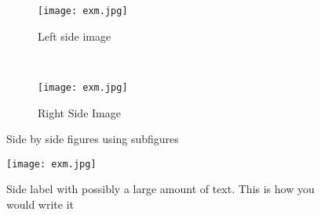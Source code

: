 \begin{figure}[!hbt]
    \centering
    \begin{subfigure}[b]{0.4\textwidth}
        \texttt{[image: exm.jpg]}
        \caption{Left side image}
        \label{fig:left-side-image}
    \end{subfigure}
    ~ %
    \begin{subfigure}[b]{0.4\textwidth}
        \texttt{[image: exm.jpg]}
        \caption{Right Side Image}
        \label{fig:right-side-image}
    \end{subfigure}
    \caption{Side by side figures using subfigures}
    \label{fig:subfigure}
\end{figure}

\begin{SCfigure}
  \centering
  \caption{Side label with possibly a large amount of text. This is how you would write it}
  \texttt{[image: exm.jpg]}%
  \label{fig:sidecaption-fig}
\end{SCfigure}

\cite{Belk:2014}